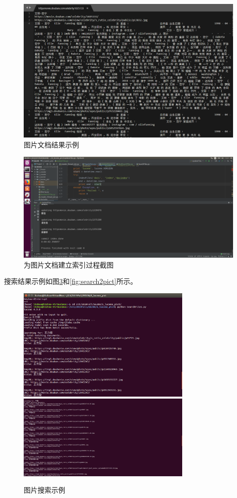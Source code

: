 \documentclass{article}
\begin{document}
\begin{figure}[htbp]
\centering
\includegraphics[width=14.5cm]{img/pictdocs.png}
\caption{图片文档结果示例}
\label{fig:docexample}
\end{figure}

\begin{figure}[htbp]
\centering
\includegraphics[width=14.5cm]{img/indexing.png}
\caption{为图片文档建立索引过程截图}
\label{fig:indexpict}
\end{figure}

搜索结果示例如图\ref{fig:search1pict}和\ref{fig:search2pict}所示。

\begin{figure}[htbp]
\centering
\includegraphics[width=8.5cm]{img/search.png}
\includegraphics[width=8.5cm]{img/search2.png}
\caption{图片搜索示例}
\label{fig:search1pict}
\end{figure}
\end{document}
